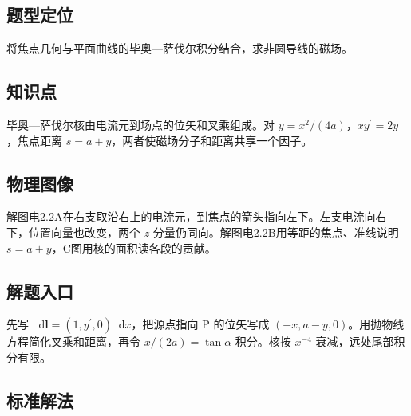 \documentclass[UTF8,fontset=fandol,a4paper,11pt]{ctexart}
\newcommand{\dd}{\mathop{}\!\mathrm{d}}
\newcommand{\vect}[1]{\bm{#1}}
\begin{document}


\subsection*{题型定位}

将焦点几何与平面曲线的毕奥—萨伐尔积分结合，求非圆导线的磁场。



\subsection*{知识点}

毕奥—萨伐尔核由电流元到场点的位矢和叉乘组成。对 $y=x^2/(4a)$，$xy^\prime=2y$，焦点距离 $s=a+y$，两者使磁场分子和距离共享一个因子。



\subsection*{物理图像}

解图电2.2A在右支取沿右上的电流元，到焦点的箭头指向左下。左支电流向右下，位置向量也改变，两个 $z$ 分量仍同向。解图电2.2B用等距的焦点、准线说明 $s=a+y$，C图用核的面积读各段的贡献。



\subsection*{解题入口}

先写 $\dd\vect l=(1,y^\prime,0)\dd x$，把源点指向 P 的位矢写成 $(-x,a-y,0)$。用抛物线方程简化叉乘和距离，再令 $x/(2a)=\tan\alpha$ 积分。核按 $x^{-4}$ 衰减，远处尾部积分有限。


\subsection*{标准解法}
\end{document}
